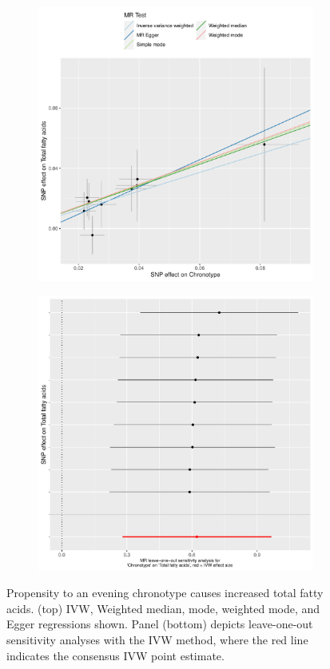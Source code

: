 \documentclass{article}
\begin{document}
\begin{figure}[htbp]
\begin{subfigure}{\linewidth}
\centering
	\includegraphics[width=.8\linewidth]{Figs/Analysis2/Chronotype_vs_Total_fatty_acids.Scatterplots.pdf}
\label{ffa3Scatter}
\end{subfigure}
\begin{subfigure}{\linewidth}
\centering
	\includegraphics[width=.8\linewidth,keepaspectratio]{Figs/Analysis2/Chronotype_vs_Total_fatty_acids.LOOplots.pdf}
\label{ffaLoo}
\end{subfigure}
\caption{Propensity to an evening chronotype causes increased total fatty acids. (top) IVW, Weighted median, mode, weighted mode, and Egger regressions shown. Panel (bottom) depicts leave-one-out sensitivity analyses with the IVW method, where the red line indicates the consensus IVW point estimate.}
\label{ffa}
\end{figure}
\end{document}
